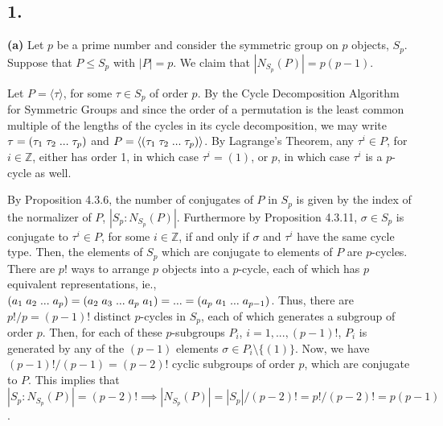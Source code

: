 \newpage
\subsection*{1.}

\textbf{(a)}
Let $p$ be a prime number and consider the symmetric group on $p$ objects, $S_p$. Suppose that $P \le S_p$ with $|P| = p$. We claim that $|N_{S_p}(P)| = p(p-1)$. 

Let $P = \langle \tau \rangle$, for some $\tau \in S_p$ of order $p$. By the Cycle Decomposition Algorithm for Symmetric Groups and since the order of a permutation is the least common multiple of the lengths of the cycles in its cycle decomposition, we may write $\tau = (\tau_1 \hspace{1mm} \tau_2 \hspace{1mm} ... \hspace{1mm} \tau_p)$ and $P = \langle (\tau_1 \hspace{1mm} \tau_2 \hspace{1mm} ... \hspace{1mm} \tau_p) \rangle$. By Lagrange's Theorem, any $\tau^i \in P$, for $i \in \mathbb{Z}$, either has order 1, in which case $\tau^i = (1)$, or $p$, in which case $\tau^i$ is a $p$-cycle as well.

By Proposition 4.3.6, the number of conjugates of $P$ in $S_p$ is given by the index of the normalizer of $P$, $|S_p:N_{S_p}(P)|$. Furthermore by Proposition 4.3.11, $\sigma \in S_p$ is conjugate to $\tau^i \in P$, for some $i \in \mathbb{Z}$, if and only if $\sigma$ and $\tau^i$ have the same cycle type. Then, the elements of $S_p$ which are conjugate to elements of $P$ are $p$-cycles. There are $p!$ ways to arrange $p$ objects into a $p$-cycle, each of which has $p$ equivalent representations, ie., $(a_1 \hspace{1mm} a_2 \hspace{1mm} ... \hspace{1mm} a_p) = (a_2 \hspace{1mm} a_3 \hspace{1mm} ... \hspace{1mm} a_p \hspace{1mm} a_1) = ... = (a_p \hspace{1mm} a_1 \hspace{1mm} ... \hspace{1mm} a_{p-1})$. Thus, there are $p!/p = (p-1)!$ distinct $p$-cycles in $S_p$, each of which generates a subgroup of order $p$. Then, for each of these $p$-subgroups $P_i$, $i = 1,...,(p-1)!$, $P_i$ is generated by any of the $(p-1)$ elements $\sigma \in P_i \setminus \{(1)\}$. Now, we have $(p-1)!/(p-1) = (p-2)!$ cyclic subgroups of order $p$, which are conjugate to $P$. This implies that $|S_p:N_{S_p}(P)| = (p-2)! \implies |N_{S_p}(P)| = |S_p|/(p-2)! = p!/(p-2)! = p(p-1)$.
\vspace{5mm}

